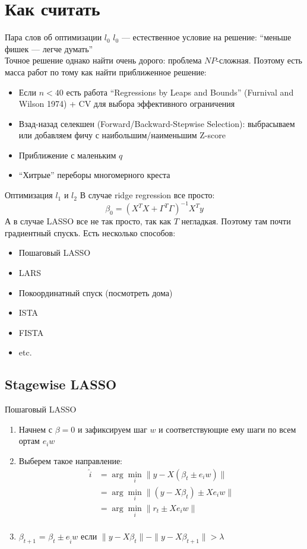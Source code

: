 \documentclass[14pt, fleqn, xcolor={dvipsnames, table}]{beamer}
\begin{document}
\section{Как считать}
\begin{frame}{Пара слов об оптимизации $l_0$}
\small
$l_0$ --- естественное условие на решение: ``меньше фишек --- легче думать'' \\
Точное решение однако найти очень дорого: проблема $NP$-сложная. Поэтому есть масса работ по тому как найти приближенное решение:
\begin{itemize}
  \item Если $n < 40$ есть работа ``Regressions by Leaps and Bounds'' (Furnival and Wilson 1974) + CV для выбора эффективного ограничения
  \item Взад-назад селекшен (Forward/Backward-Stepwise Selection): выбрасываем или добавляем фичу с наибольшим/наименьшим Z-score
  \item Приближение с маленьким $q$
  \item ``Хитрые'' переборы многомерного креста
\end{itemize}
\end{frame}

\begin{frame}{Оптимизация $l_1$ и $l_2$}
\small
В случае ridge regression все просто:
$$
\beta_0 = \left(X^{T}X+ \Gamma^{T} \Gamma\right)^{-1}X^{T}y
$$
А в случае LASSO все не так просто, так как $T$ негладкая. Поэтому там почти градиентный спускъ. Есть несколько способов:
\begin{itemize}
\small
  \item Пошаговый LASSO
  \item LARS
  \item Покоординатный спуск (посмотреть дома)
  \item ISTA
  \item FISTA
  \item etc.
\end{itemize}
\end{frame}

\subsection{Stagewise LASSO}
\begin{frame}{Пошаговый LASSO}
\begin{enumerate}
  \item Начнем с $\beta = 0$ и зафиксируем шаг $w$ и соответствующие ему шаги по всем ортам $e_iw$
  \item Выберем такое направление: 
  $$\begin{array}{rl}
  \hat{i} &= \arg \min_i \|y - X\left(\beta_t \pm e_iw\right)\|\\
          &= \arg \min_i \|\left(y - X\beta_t\right) \pm X e_iw\| \\
          &= \arg \min_i \|r_t \pm X e_iw\| \\
  \end{array}$$
  \item $\beta_{t+1}$ = $\beta_{t} \pm e_{\hat{i}}w$ если $\|y - X\beta_t\| - \|y - X\beta_{t+1}\| > \lambda$
\end{enumerate}
\end{frame}
\end{document}
